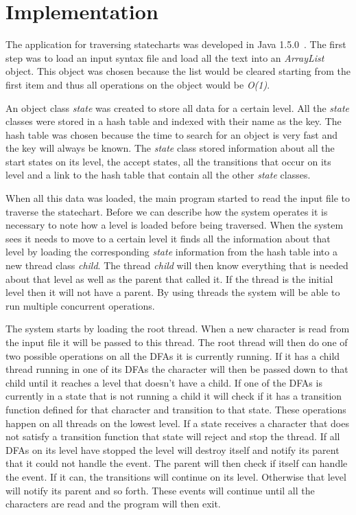 \documentclass[a4paper,11pt,titlepage]{article}
\begin{document}
\section{Implementation}
The application for traversing statecharts was developed in Java 1.5.0~\cite{Java}. The first step was to load an input syntax file and load all the text into an \emph{ArrayList} object. This object was chosen because the list would be cleared starting from the first item and thus all operations on the object would be \emph{O(1)}.

An object class \emph{state} was created to store all data for a certain level. All the \emph{state} classes were stored in a hash table and indexed with their name as the key. The hash table was chosen because the time to search for an object is very fast and the key will always be known. The \emph{state} class stored information about all the start states on its level, the accept states, all the transitions that occur on its level and a link to the hash table that contain all the other \emph{state} classes.

When all this data was loaded, the main program started to read the input file to traverse the statechart. Before we can describe how the system operates it is necessary to note how a level is loaded before being traversed. When the system sees it needs to move to a certain level it finds all the information about that level by loading the corresponding \emph{state} information from the hash table into a new thread class \emph{child}. The thread \emph{child} will then know everything that is needed about that level as well as the parent that called it. If the thread is the initial level then it will not have a parent. By using threads the system will be able to run multiple concurrent operations.

The system starts by loading the root thread. When a new character is read from the input file it will be passed to this thread. The root thread will then do one of two possible operations on all the DFAs it is currently running. If it has a child thread running in one of its DFAs the character will then be passed down to that child until it reaches a level that doesn't have a child. If one of the DFAs is currently in a state that is not running a child it will check if it has a transition function defined for that character and transition to that state. These operations happen on all threads on the lowest level. If a state receives a character that does not satisfy a transition function that state will reject and stop the thread. If all DFAs on its level have stopped the level will destroy itself and notify its parent that it could not handle the event. The parent will then  check if itself can handle the event. If it can, the transitions will continue on its level. Otherwise that level will notify its parent and so forth. These events will continue until all the characters are read and the program will then exit.
\newpage
\end{document}
